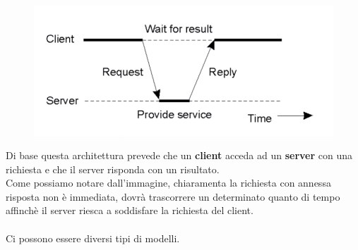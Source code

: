 \documentclass[12pt, a4paper]{article}
\begin{document}
    \begin{figure}[htbp]
        \centering
        \includegraphics[scale=0.5]{clientserver.png}  
    \end{figure}
    Di base questa architettura prevede che un \textbf{client} acceda ad un \textbf{server} con
    una richiesta e che il server risponda con un risultato.
    \\Come possiamo notare dall'immagine, chiaramenta la richiesta con annessa risposta
    non è immediata, dovrà trascorrere un determinato quanto di tempo affinchè il server
    riesca a soddisfare la richiesta del client.
    \\\\
    Ci possono essere diversi tipi di modelli.
\end{document}
